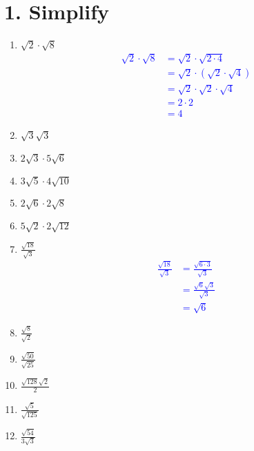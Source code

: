 \documentclass{hw}
\begin{document}
\section*{\normalsize 1. Simplify}
\begin{enumerate}[label=\alph*.]
    \item $\sqrt{2} \cdot \sqrt{8}$
        \textcolor{blue}{
        \begin{align*}
            \sqrt{2} \cdot \sqrt{8} &= \sqrt{2} \cdot \sqrt{2 \cdot 4} \\
                                    &= \sqrt{2} \cdot (\sqrt{2} \cdot \sqrt{4}) \\
                                    &= \sqrt{2} \cdot \sqrt{2} \cdot \sqrt{4} \\
                                    &= 2 \cdot 2 \\
                                    &= 4
        \end{align*}
        }
    \item $\sqrt{3}\sqrt{3}$
        \studentworkspace
    \item $2\sqrt{3} \cdot 5\sqrt{6}$
        \studentxlargeworkspace
    \item $3\sqrt{5} \cdot 4\sqrt{10}$
        \studentxlargeworkspace
    \item $2\sqrt{6} \cdot 2\sqrt{8}$
        \studentxlargeworkspace
    \item $5\sqrt{2} \cdot 2\sqrt{12}$
        \studentxlargeworkspace
    \item $\frac{\sqrt{18}}{\sqrt{3}}$
        \textcolor{blue}{
        \begin{align*}
            \frac{\sqrt{18}}{\sqrt{3}} &= \frac{\sqrt{6 \cdot 3}}{\sqrt{3}} \\
                                       &= \frac{\sqrt{6} \sqrt{3}}{\sqrt{3}} \\
                                       &= \sqrt{6}
        \end{align*}
        }
    \item $\frac{\sqrt{8}}{\sqrt{2}}$
        \studentxlargeworkspace
    \item $\frac{\sqrt{50}}{\sqrt{25}}$
        \studentxlargeworkspace
    \item $\frac{\sqrt{128}\sqrt{2}}{2}$
        \studentxlargeworkspace
    \item $\frac{\sqrt{5}}{\sqrt{125}}$
        \studentxlargeworkspace
    \item $\frac{\sqrt{54}}{3\sqrt{3}}$
        \studentxlargeworkspace
\end{enumerate}
\end{document}
